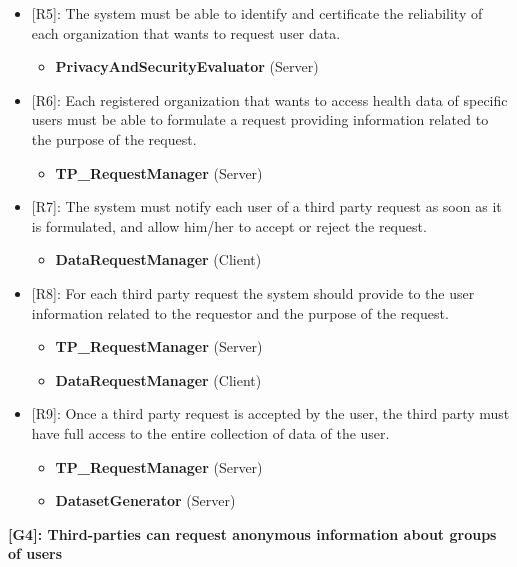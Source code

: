 \begin{itemize}
	\item {[R5]: The system must be able to identify and certificate the reliability of each organization that wants to request user data.}
	\begin{itemize}
		\item {\textbf{PrivacyAndSecurityEvaluator} (Server)}
	\end{itemize}   
	\item {[R6]: Each registered organization that wants to access health data of specific users must be able to formulate a request providing information related to the purpose of the request.}
	\begin{itemize}
		\item {\textbf{TP\_RequestManager} (Server)}
	\end{itemize}   
	\item {[R7]: The system must notify each user of a third party request as soon as it is formulated, and allow him/her to accept or reject the request.}
	\begin{itemize}
		\item {\textbf{DataRequestManager} (Client)}
	\end{itemize}   
	\item {[R8]: For each third party request the system should provide to the user information related to the requestor and the purpose of the request.}
	\begin{itemize}
		\item {\textbf{TP\_RequestManager} (Server)}
		\item {\textbf{DataRequestManager} (Client)}
	\end{itemize}   
	\item {[R9]: Once a third party request is accepted by the user, the third party must have full access to the entire collection of data of the user.}
	\begin{itemize}
		\item {\textbf{TP\_RequestManager} (Server)}
		\item {\textbf{DatasetGenerator} (Server)}
	\end{itemize}   
\end{itemize}

\textbf{[G4]: Third-parties can request anonymous information about groups of users}

